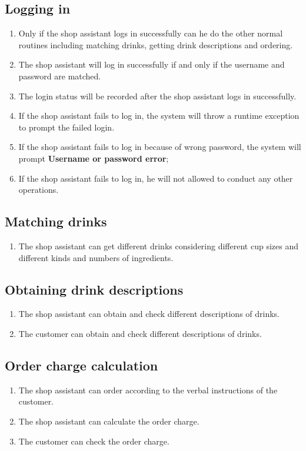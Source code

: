 \documentclass[a4paper]{report}
\begin{document}
\subsection{Logging in}
\begin{enumerate}
\item Only if the shop assistant logs in successfully can he do the other normal routines including matching drinks, getting drink descriptions and ordering.
\item The shop assistant will log in successfully if and only if the username and password are matched.
\item The login status will be recorded after the shop assistant logs in successfully.
\item If the shop assistant fails to log in, the system will throw a runtime exception to prompt the failed login.
\item If the shop assistant fails to log in because of wrong password, the system will prompt \textbf{Username or password error};
\item If the shop assistant fails to log in, he will not allowed to conduct any other operations.
\end{enumerate}

\subsection{Matching drinks}

\begin{enumerate}
\item The shop assistant can get different drinks considering different cup sizes and different kinds and numbers of ingredients.
\end{enumerate}


\subsection{Obtaining drink descriptions}
\begin{enumerate}
\item The shop assistant can obtain and check different descriptions of drinks.
\item The customer can obtain and check different descriptions of drinks.
\end{enumerate}

\subsection{Order charge calculation}
\begin{enumerate}
\item The shop assistant can order according to the verbal instructions of the customer.
\item The shop assistant can calculate the order charge.
\item The customer can check the order charge. 
\end{enumerate}
\end{document}
